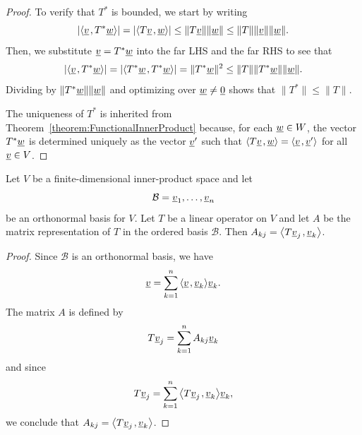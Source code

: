 \begin{proof}
To verify that $T^*$ is bounded, we start by writing
\[  |{\left\langle  \underline{v}  \mskip2mu ,  T^* \underline{w}  \right\rangle}| = |{\left\langle  T \underline{v}  \mskip2mu ,  \underline{w}  \right\rangle}| \leq \|T \underline{v}\| \|\underline{w}\| \leq \| T \| \|\underline{v}\| \|\underline{w}\|.  \]
Then, we substitute $\underline{v}=T^* \underline{w}$ into the far LHS and the far RHS to see that
\[  |{\left\langle  \underline{v}  \mskip2mu ,  T^* \underline{w}  \right\rangle}| = |{\left\langle  T^* \underline{w}  \mskip2mu ,  T^* \underline{w}  \right\rangle}| = \| T^* \underline{w}\|^2 \leq \| T \|  \|T^* \underline{w}\| \|\underline{w}\|. \]
Dividing by $\|T^* \underline{w}\| \|\underline{w}\|$ and optimizing over $\underline{w} \neq \underline{0}$ shows that $\|T^* \| \leq \|T \|$.

The uniqueness of $T^*$ is inherited from Theorem~\ref{theorem:FunctionalInnerProduct} because, for each $\underline{w}\in W$, the vector $T^* \underline{w}$ is determined uniquely as the vector $\underline{v}'$ such that ${\left\langle  T \underline{v}  \mskip2mu ,  \underline{w}  \right\rangle} = {\left\langle  \underline{v}  \mskip2mu ,  \underline{v}'  \right\rangle}$ for all $\underline{v} \in V$.
\end{proof}

\begin{theorem}
Let $V$ be a finite-dimensional inner-product space and let
\begin{equation*}
\mathcal{B} = \underline{v}_1, \ldots, \underline{v}_n
\end{equation*}
be an orthonormal basis for $V$.
Let $T$ be a linear operator on $V$ and let $A$ be the matrix representation of $T$ in the ordered basis $\mathcal{B}$.
Then $A_{kj} = {\left\langle  T \underline{v}_j  \mskip2mu ,  \underline{v}_k  \right\rangle}$.
\end{theorem}
\begin{proof}
Since $\mathcal{B}$ is an orthonormal basis, we have
\begin{equation*}
\underline{v} = \sum_{k=1}^n {\left\langle  \underline{v}  \mskip2mu ,  \underline{v}_k  \right\rangle} \underline{v}_k .
\end{equation*}
The matrix $A$ is defined by
\begin{equation*}
T \underline{v}_j = \sum_{k=1}^n A_{kj} \underline{v}_k
\end{equation*}
and since
\begin{equation*}
T \underline{v}_j = \sum_{k=1}^n {\left\langle  T \underline{v}_j  \mskip2mu ,  \underline{v}_k  \right\rangle} \underline{v}_k ,
\end{equation*}
we conclude that $A_{kj} = {\left\langle  T \underline{v}_j  \mskip2mu ,  \underline{v}_k  \right\rangle}$.
\end{proof}

